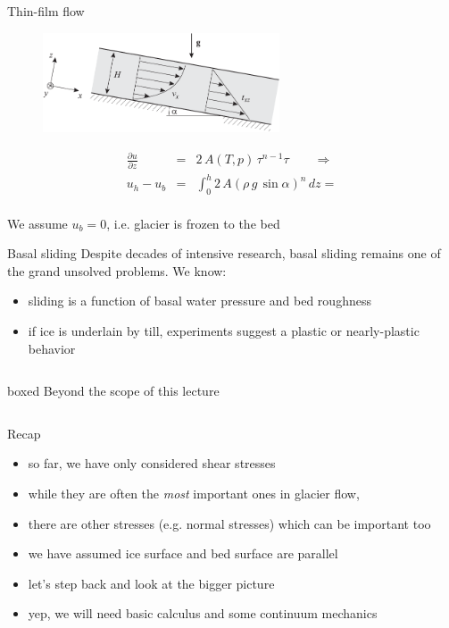 \documentclass[hide notes,intlimits]{beamer}
\begin{document}
\begin{frame}{Thin-film flow}
  \begin{figure}
    \includegraphics[width=7cm]{figures/fig_3_11}
  \end{figure}
  \begin{equation*}
    \begin{array}{ccl}
      \frac{\partial u}{\partial z}  & = &  2\,A(T,p)\,\tau^{n-1}\tau \qquad \Rightarrow \\[1em]
      u_{h} - u_{b} &  = & \int_{0}^{h} 2\,A\left(\rho\,g\,\sin{\alpha}\right)^{n}\,dz =
    \end{array}
  \end{equation*}
  \\[.75em]
  We assume $u_b=0$, i.e. glacier is frozen to the bed
\end{frame}


\begin{frame}{Basal sliding}
  Despite decades of intensive research, basal sliding remains one of the grand unsolved problems. We know:
  \begin{itemize}
  \item sliding is a function of basal water pressure and bed roughness
  \item if ice is underlain by till, experiments suggest a plastic or nearly-plastic behavior
  \end{itemize}
  \vspace{1em}
  \begin{columns}
    \column[C]{7.5cm}
    \begin{beamercolorbox}[rounded=true,shadow=true]{boxed}
      Beyond the scope of this lecture
    \end{beamercolorbox}
  \end{columns}
\end{frame}

\begin{frame}{Recap}
  \begin{itemize}
    \item so far, we have only considered shear stresses 
    \item while they are often the \emph{most} important ones in glacier flow,
    \item there are other stresses (e.g. normal stresses) which can be important too
    \item we have assumed ice surface and bed surface are parallel
    \item let's step back and look at the bigger picture
    \item yep, we will need basic calculus and some continuum mechanics
  \end{itemize}
\end{frame}
\end{document}
